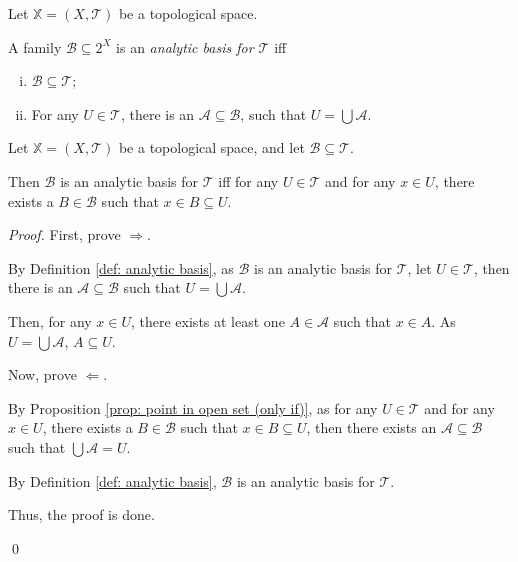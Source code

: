 \begin{definition}
	\label{def: analytic basis}
	Let $\mathbb X = (X, \mathcal T)$ be a topological space.
	
	A family $\mathcal B \subseteq 2^X$ is an \textit{analytic basis for $\mathcal T$} iff
	\begin{enumerate}[(i)]
		\item $\mathcal B \subseteq \mathcal T$;
		\item For any $U \in \mathcal T$, there is an $\mathcal A \subseteq \mathcal B$, such that $U = \bigcup \mathcal A$.
	\end{enumerate}
\end{definition}


\begin{proposition}
	\label{prop: analytic basis}
	Let $\mathbb X = (X, \mathcal T)$ be a topological space, and let $\mathcal B \subseteq \mathcal T$.
	
	Then $\mathcal B$ is an analytic basis for $\mathcal T$ iff for any $U \in \mathcal T$ and for any $x \in U$, there exists a $B \in \mathcal B$ such that $x \in B \subseteq U$.
	
	\begin{proof}
		First, prove $\Rightarrow$.
		
		By Definition \ref{def: analytic basis}, as $\mathcal B$ is an analytic basis for $\mathcal T$, let $U \in \mathcal T$, then there is an $\mathcal A \subseteq \mathcal B$ such that $U = \bigcup \mathcal A$.
		
		Then, for any $x \in U$, there exists at least one $A \in \mathcal A$ such that $x \in A$. As $U = \bigcup\mathcal A$, $A \subseteq U$.
		
		\qedlm
		
		Now, prove $\Leftarrow$.
		
		By Proposition \ref{prop: point in open set (only if)}, as for any $U \in \mathcal T$ and for any $x \in U$, there exists a $B \in \mathcal B$ such that $x \in B \subseteq U$, then there exists an $\mathcal A \subseteq \mathcal B$ such that $\bigcup \mathcal A = U$.
		
		By Definition \ref{def: analytic basis}, $\mathcal B$ is an analytic basis for $\mathcal T$.
		
		\qedlm
		
		Thus, the proof is done.
		
		\qed
	\end{proof}
\end{proposition}


